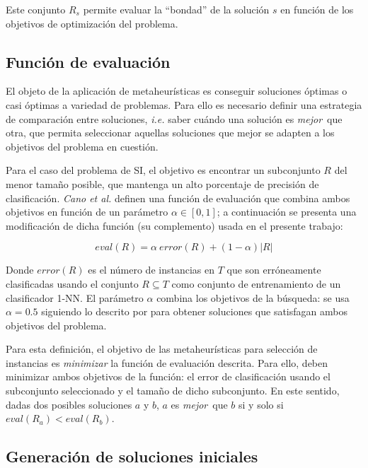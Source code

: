 Este conjunto $R_s$ permite evaluar la ``bondad'' de la solución $s$ en función de los objetivos de optimización del problema.

\subsection{Función de evaluación}

El objeto de la aplicación de metaheurísticas es conseguir soluciones óptimas o casi óptimas a variedad de problemas. Para ello es necesario definir una estrategia de comparación entre soluciones, \emph{i.e.} saber cuándo una solución es \guillemotleft\emph{mejor}\guillemotright\ que otra, que permita seleccionar aquellas soluciones que mejor se adapten a los objetivos del problema en cuestión.

Para el caso del problema de SI, el objetivo es encontrar un subconjunto $R$ del menor tamaño posible, que mantenga un alto porcentaje de precisión de clasificación. \emph{Cano et al.} \cite{cano2003using} definen una función de evaluación que combina ambos objetivos en función de un parámetro $\alpha \in [0,1]$; a continuación se presenta una modificación de dicha función (su complemento) usada en el presente trabajo:

\begin{equation}
\mathit{eval}(R) = \alpha\ \mathit{error}(R) + (1 - \alpha) \vert R \vert
\end{equation}

Donde $\mathit{error}(R)$ es el número de instancias en $T$ que son erróneamente clasificadas usando el conjunto $R \subseteq T$ como conjunto de entrenamiento de un clasificador 1-NN. El parámetro $\alpha$ combina los objetivos de la búsqueda: se usa $\alpha = 0.5$ siguiendo lo descrito por \cite{cano2003using} para obtener soluciones que satisfagan ambos objetivos del problema.

Para esta definición, el objetivo de las metaheurísticas para selección de instancias es \emph{minimizar} la función de evaluación descrita. Para ello, deben minimizar ambos objetivos de la función: el error de clasificación usando el subconjunto seleccionado y el tamaño de dicho subconjunto. En este sentido, dadas dos posibles soluciones $a$ y $b$, $a$ es \guillemotleft\emph{mejor}\guillemotright\ que $b$ si y solo si $\mathit{eval}(R_a) < \mathit{eval}(R_b)$.

\subsection{Generación de soluciones iniciales}
\label{generacion-sol-inic}

